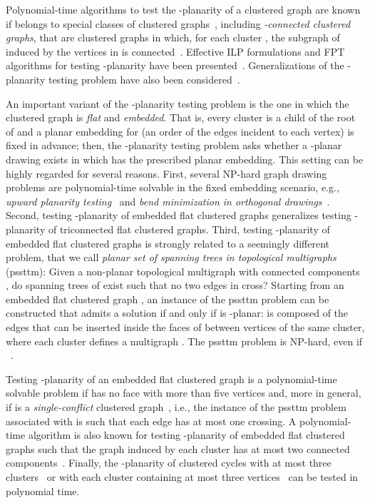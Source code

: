 \documentclass[letter,runningheads]{llncs}
\begin{document}
Polynomial-time algorithms to test the -planarity of a clustered graph  are known if  belongs to special classes of clustered graphs~\cite{cw-cccg-06,cdpp-cccc-05,df-ectefcgsf-09,fce-pcg-95,d-ltarcgp-98,cdfpp-cccg-08,gls-cecg-05,gjlmpw-actcg-02,jkkpsv-scceg-09,jstv-cfoe-08}, including {\em -connected clustered graphs}, that are clustered graphs  in which, for each cluster , the subgraph  of  induced by the vertices in  is connected~\cite{fce-pcg-95,d-ltarcgp-98,cdfpp-cccg-08}. Effective ILP formulations and FPT algorithms for testing -planarity have been presented~\cite{cgjkm-ssscp-09,ck-ssscp-12}. Generalizations of the -planarity testing problem have also been considered~\cite{addfpr-rccp-14,afp-scgc-09,dgl-ocp-08}.

An important variant of the -planarity testing problem is the one in which the clustered graph  is {\em flat} and {\em embedded}. That is, every cluster is a child of the root of  and a planar embedding for  (an order of the edges incident to each vertex) is fixed in advance; then, the -planarity testing problem asks whether a -planar drawing exists in which  has the prescribed planar embedding. This setting can be highly regarded for several reasons. First, several NP-hard graph drawing problems are polynomial-time solvable in the fixed embedding scenario, e.g., {\em upward planarity testing}~\cite{bdlm-udtd-94,GT01} and {\em bend minimization in orthogonal drawings}~\cite{t-eggmnb-87,GT01}. Second, testing -planarity of embedded flat clustered graphs generalizes testing -planarity of triconnected flat clustered graphs. Third, testing -planarity of embedded flat clustered graphs is strongly related to a seemingly different problem, that we call {\em planar set of spanning trees in topological multigraphs} ({\sc pssttm}): Given a non-planar topological multigraph  with  connected components , do spanning trees  of  exist such that no two edges in  cross? Starting from an embedded flat clustered graph , an instance  of the {\sc pssttm} problem can be constructed that admits a solution if and only if  is -planar:  is composed of the edges that can be inserted inside the faces of  between vertices of the same cluster, where each cluster defines a multigraph . The {\sc pssttm} problem is NP-hard, even if ~\cite{kln-nstl-91}.



Testing -planarity of an embedded flat clustered graph  is a polynomial-time solvable problem if  has no face with more than five vertices and, more in general, if  is a {\em single-conflict} clustered graph~\cite{df-ectefcgsf-09}, i.e., the instance  of the {\sc pssttm} problem associated with  is such that each edge has at most one crossing. A polynomial-time algorithm is also known for testing -planarity of embedded flat clustered graphs such that the graph induced by each cluster has at most two connected components~\cite{jjkl-ecgtcc-09}. Finally, the -planarity of clustered cycles with at most three clusters~\cite{cdpp-cccc-05} or with each cluster containing at most three vertices~\cite{jkkpsv-scceg-09} can be tested in polynomial time.
\end{document}
